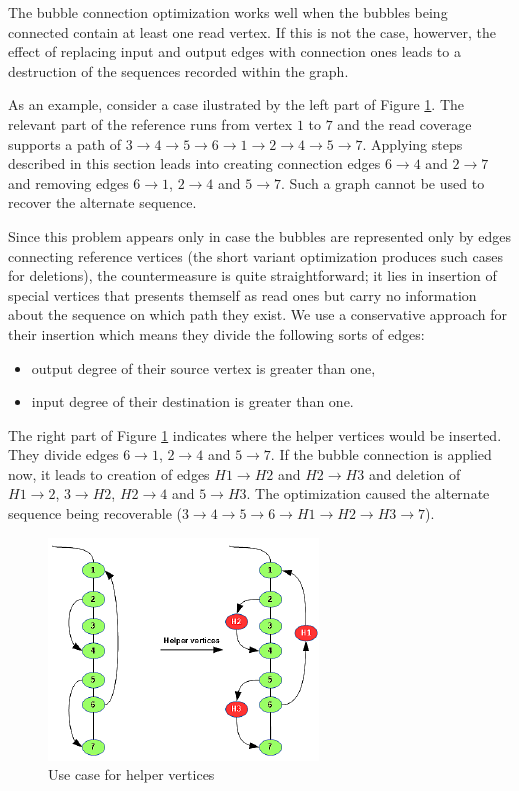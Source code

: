 The bubble connection optimization works well when the bubbles being connected contain at least one read vertex. If this is not the case, howerver, the effect of replacing input and output edges with connection ones leads to a destruction of the sequences recorded within the graph.

As an example, consider a case ilustrated by the left part of Figure \ref{fig:helper-vertices}. The relevant part of the reference runs from vertex $1$ to $7$ and the read coverage supports a path of $3 \to 4 \to 5 \to 6 \to 1 \to 2 \to 4 \to 5 \to 7$. Applying steps described in this section leads into creating connection edges $6 \to 4$ and $2 \to 7$ and removing edges $6 \to 1$, $2 \to 4$ and $5 \to 7$. Such a graph cannot be used to recover the alternate sequence.

Since this problem appears only in case the bubbles are represented only by edges connecting reference vertices (the short variant optimization produces such cases for deletions), the countermeasure is quite straightforward; it lies in insertion of special vertices that presents themself as read ones but carry no information about the sequence on which path they exist. We use a conservative approach for their insertion which means they divide the following sorts of edges:
\begin{itemize}
\item output degree of their source vertex is greater than one,
\item input degree of their destination is greater than one.
\end{itemize}

The right part of Figure \ref{fig:helper-vertices} indicates where the helper vertices would be inserted. They divide edges $6 \to 1$, $2 \to 4$ and $5 \to 7$. If the bubble connection is applied now, it leads to creation of edges $H1 \to H2$ and $H2 \to H3$ and deletion of $H1 \to 2$, $3 \to H2$, $H2 \to 4$ and $5 \to H3$. The optimization caused the alternate sequence being recoverable ($3 \to 4 \to 5 \to 6 \to H1 \to H2 \to H3 \to 7$).

\begin{figure}[h]
	\centering
	\includegraphics{img/helper-vertices.pdf}
	\caption{Use case for helper vertices}
	\label{fig:helper-vertices}
\end{figure}

